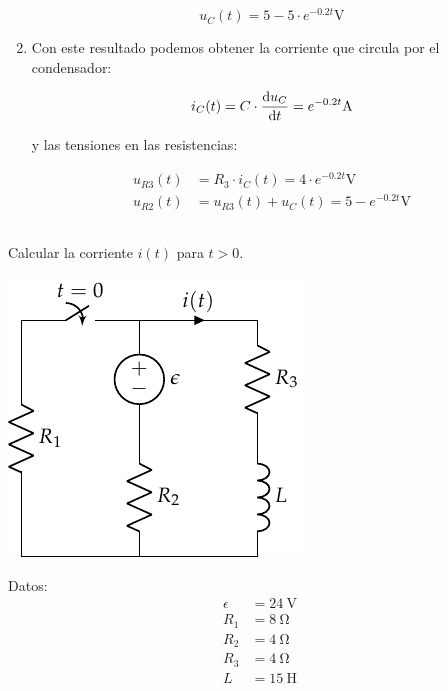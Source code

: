 \documentclass[12pt]{article}
\begin{document}
\begin{enumerate}
\begin{equation*}
  u_C(t) = 5 - 5 \cdot e^{-0.2t} \unit{\volt}
\end{equation*}

\item Con este resultado podemos obtener la corriente que circula por
  el condensador:

\begin{equation*}
  i_C(t) = C \cdot \diff{u_C}{t} = e^{-0.2t} \unit{\ampere}
\end{equation*}

y las tensiones en las resistencias:

\begin{align*}
  u_{R3}(t) &=  R_3 \cdot i_C(t) = 4 \cdot e^{-0.2t} \unit{\volt}\\
  u_{R2}(t) &=  u_{R3}(t) + u_C(t) = 5 - e^{-0.2t} \unit{\volt}
\end{align*}
  


  
  
\end{enumerate}

\clearpage

\subsection{}

Calcular la corriente $i(t)$ para $t > 0$.

\begin{minipage}{0.5\textwidth}
  \includegraphics{figs/FM_4_2}
\end{minipage}
\hfill
\begin{minipage}{0.5\textwidth}
  Datos:
  \begin{align*}
    \epsilon &= \SI{24}{\volt}\\
    R_1 &= \SI{8}{\ohm}\\
    R_2 &= \SI{4}{\ohm}\\
    R_3 &= \SI{4}{\ohm}\\
    L &= \SI{15}{\henry}
  \end{align*}
\end{minipage}
\end{document}
